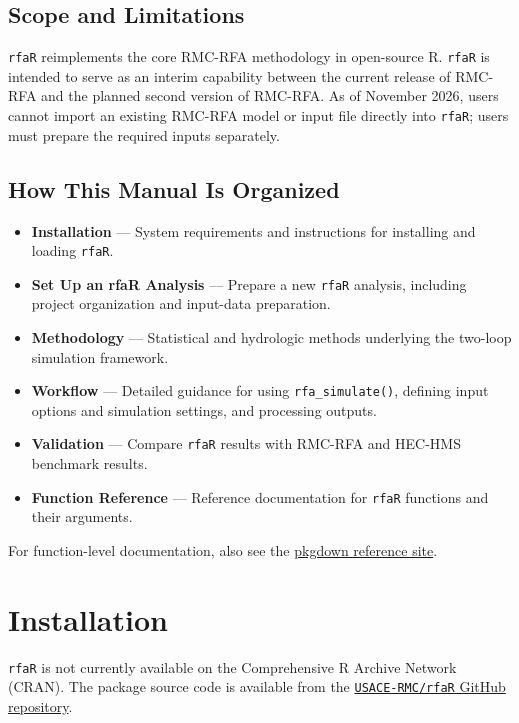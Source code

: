 \documentclass[
  letterpaper,
  DIV=11,
  numbers=noendperiod]{scrreprt}
\providecommand{\tightlist}{%
  \setlength{\itemsep}{0pt}\setlength{\parskip}{0pt}}
\begin{document}
\section{Scope and Limitations}\label{scope-and-limitations}

\texttt{rfaR} reimplements the core RMC-RFA methodology in open-source
R. \texttt{rfaR} is intended to serve as an interim capability between
the current release of RMC-RFA and the planned second version of
RMC-RFA. As of November 2026, users cannot import an existing RMC-RFA
model or input file directly into \texttt{rfaR}; users must prepare the
required inputs separately.

\section{How This Manual Is
Organized}\label{how-this-manual-is-organized}

\begin{itemize}
\tightlist
\item
  \textbf{Installation} --- System requirements and instructions for
  installing and loading \texttt{rfaR}.
\item
  \textbf{Set Up an rfaR Analysis} --- Prepare a new \texttt{rfaR}
  analysis, including project organization and input-data preparation.
\item
  \textbf{Methodology} --- Statistical and hydrologic methods underlying
  the two-loop simulation framework.
\item
  \textbf{Workflow} --- Detailed guidance for using
  \texttt{rfa\_simulate()}, defining input options and simulation
  settings, and processing outputs.
\item
  \textbf{Validation} --- Compare \texttt{rfaR} results with RMC-RFA and
  HEC-HMS benchmark results.
\item
  \textbf{Function Reference} --- Reference documentation for
  \texttt{rfaR} functions and their arguments.
\end{itemize}

For function-level documentation, also see the
\href{https://usace-rmc.github.io/rfaR/}{pkgdown reference site}.


\chapter{Installation}\label{installation}

\texttt{rfaR} is not currently available on the Comprehensive R Archive
Network (CRAN). The package source code is available from the
\href{https://github.com/USACE-RMC/rfaR}{\texttt{USACE-RMC/rfaR} GitHub
repository}.
\end{document}

